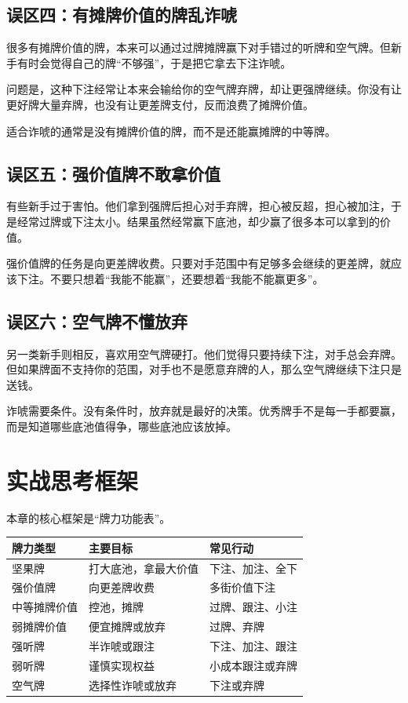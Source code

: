 \subsection{误区四：有摊牌价值的牌乱诈唬}

很多有摊牌价值的牌，本来可以通过过牌摊牌赢下对手错过的听牌和空气牌。但新手有时会觉得自己的牌“不够强”，于是把它拿去下注诈唬。

问题是，这种下注经常让本来会输给你的空气牌弃牌，却让更强牌继续。你没有让更好牌大量弃牌，也没有让更差牌支付，反而浪费了摊牌价值。

适合诈唬的通常是没有摊牌价值的牌，而不是还能赢摊牌的中等牌。

\subsection{误区五：强价值牌不敢拿价值}

有些新手过于害怕。他们拿到强牌后担心对手弃牌，担心被反超，担心被加注，于是经常过牌或下注太小。结果虽然经常赢下底池，却少赢了很多本可以拿到的价值。

强价值牌的任务是向更差牌收费。只要对手范围中有足够多会继续的更差牌，就应该下注。不要只想着“我能不能赢”，还要想着“我能不能赢更多”。

\subsection{误区六：空气牌不懂放弃}

另一类新手则相反，喜欢用空气牌硬打。他们觉得只要持续下注，对手总会弃牌。但如果牌面不支持你的范围，对手也不是愿意弃牌的人，那么空气牌继续下注只是送钱。

诈唬需要条件。没有条件时，放弃就是最好的决策。优秀牌手不是每一手都要赢，而是知道哪些底池值得争，哪些底池应该放掉。

\section{实战思考框架}

本章的核心框架是“牌力功能表”。

\begin{center}
\begin{tabular}{lll}
\toprule
\textbf{牌力类型} & \textbf{主要目标} & \textbf{常见行动} \\
\midrule
坚果牌 & 打大底池，拿最大价值 & 下注、加注、全下 \\
强价值牌 & 向更差牌收费 & 多街价值下注 \\
中等摊牌价值 & 控池，摊牌 & 过牌、跟注、小注 \\
弱摊牌价值 & 便宜摊牌或放弃 & 过牌、弃牌 \\
强听牌 & 半诈唬或跟注 & 下注、加注、跟注 \\
弱听牌 & 谨慎实现权益 & 小成本跟注或弃牌 \\
空气牌 & 选择性诈唬或放弃 & 下注或弃牌 \\
\bottomrule
\end{tabular}
\end{center}

